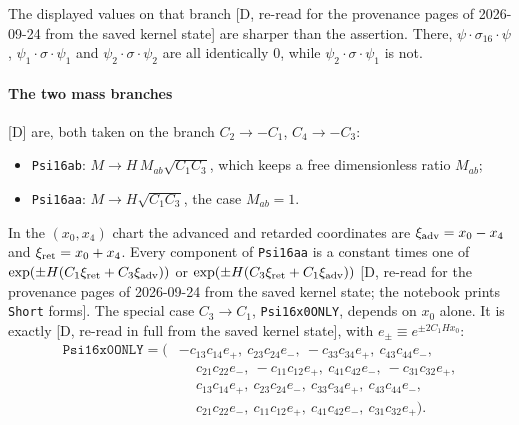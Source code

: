 The displayed values on that branch [D, re-read for the provenance pages of 2026-09-24 from the saved kernel state]
are sharper than the assertion. There, $\psi\cdot\sigma_{16}\cdot\psi$,
$\psi_1\cdot\sigma\cdot\psi_1$ and $\psi_2\cdot\sigma\cdot\psi_2$ are all identically $0$, while
$\psi_2\cdot\sigma\cdot\psi_1$ is not.

\paragraph{The two mass branches} [D] are, both taken on the branch
$C_2\to-C_1$, $C_4\to-C_3$:
\begin{itemize}
  \item \texttt{Psi16ab}: $M\to H\,M_{ab}\sqrt{C_1C_3}$, which keeps a free dimensionless ratio
        $M_{ab}$;
  \item \texttt{Psi16aa}: $M\to H\sqrt{C_1C_3}$, the case $M_{ab}=1$.
\end{itemize}
In the $(x_0,x_4)$ chart the advanced and retarded coordinates are $\xi_{\rm adv}=x_0-x_4$ and
$\xi_{\rm ret}=x_0+x_4$. Every component of \texttt{Psi16aa} is a constant times one of
$\exp(\pm H(C_1\xi_{\rm ret}+C_3\xi_{\rm adv}))$ or $\exp(\pm H(C_3\xi_{\rm ret}+C_1\xi_{\rm adv}))$
[D, re-read for the provenance pages of 2026-09-24 from the saved kernel state; the notebook prints \texttt{Short}
forms]. The special case $C_3\to C_1$, \texttt{Psi16x0ONLY}, depends on $x_0$ alone. It is
exactly [D, re-read in full from the saved kernel state], with $e_\pm \equiv e^{\pm 2C_1Hx_0}$:
\begin{align*}
\texttt{Psi16x0ONLY}=\bigl(&{-c_{13}c_{14}e_+},\ c_{23}c_{24}e_-,\ -c_{33}c_{34}e_+,\ c_{43}c_{44}e_-,\\
&\phantom{-}c_{21}c_{22}e_-,\ -c_{11}c_{12}e_+,\ c_{41}c_{42}e_-,\ -c_{31}c_{32}e_+,\\
&\phantom{-}c_{13}c_{14}e_+,\ c_{23}c_{24}e_-,\ c_{33}c_{34}e_+,\ c_{43}c_{44}e_-,\\
&\phantom{-}c_{21}c_{22}e_-,\ c_{11}c_{12}e_+,\ c_{41}c_{42}e_-,\ c_{31}c_{32}e_+\bigr).
\end{align*}

